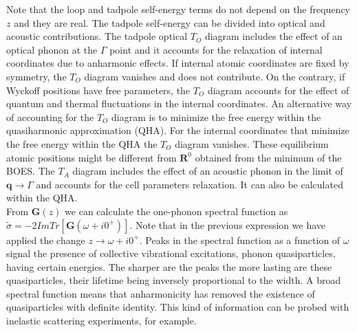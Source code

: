 Note that the loop and tadpole self-energy terms do not depend on the frequency $z$ and they are real. The tadpole self-energy can be divided into optical and acoustic contributions. The tadpole optical $T_{O}$ diagram includes 
the effect of an optical phonon at the $\Gamma$ point and it accounts for the relaxation of internal coordinates due to anharmonic effects. If internal atomic coordinates are fixed by symmetry, the $T_{O}$ diagram vanishes and 
does not contribute\cite{calandra2007anharmonic}. On the contrary, if Wyckoff positions have free parameters\cite{aroyo2011crystallography}, the $T_{O}$ diagram accounts for the effect of quantum and thermal fluctuations in the 
internal coordinates. An alternative way of accounting for the $T_{O}$ diagram is to minimize the free energy within the quasiharmonic approximation (QHA)\cite{bonini2007phonon}. For the internal coordinates that minimize the 
free energy within the QHA the $T_{O}$ diagram vanishes. These equilibrium atomic positions might be different from $\mathbf{R}^{0}$ obtained from the minimum of the BOES. The $T_{A}$ diagram includes the effect of an acoustic 
phonon in the limit of $\mathbf{q}\rightarrow\Gamma$ and accounts for the cell parameters relaxation. It can also be calculated within the QHA.  
\\

From $\boldsymbol{G}(z)$ we can calculate the one-phonon spectral function as \\ $\tilde{\sigma}=-2ImTr[\boldsymbol{G}(\omega+i0^{+})]$. Note that in the previous expression we have applied the change $z\rightarrow\omega+i0^{+}$. Peaks in the spectral function as a function of $\omega$ signal the presence of 
collective vibrational excitations, phonon quasiparticles, having certain energies. The sharper are the peaks the more lasting are these quasiparticles, their lifetime being inversely proportional to the width. A broad 
spectral function means that anharmonicity has removed the existence of quasiparticles with definite identity. This kind of information can be probed with inelastic scattering experiments, for example.  \\ 

